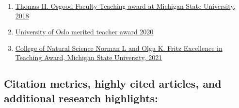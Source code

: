 \documentclass[%
oneside,                 %
final,                   %
10pt]{article}
\begin{document}
\begin{enumerate}
\item \href{{https://web.pa.msu.edu/alumni/awards/osgood_fac_awards.html}}{Thomas H. Osgood Faculty Teaching award at Michigan State University, 2018}

\item \href{{https://titan.uio.no/utdanning/2020/to-fysikere-belonnes-for%

\item \href{{https://natsci.msu.edu/faculty-staff/awards/#eta}}{College of Natural Science Norman L and Olga K. Fritz Excellence in Teaching Award, Michigan State University, 2021}
\end{enumerate}

\noindent
\subsection*{Citation metrics, highly cited articles, and additional research highlights:}
\end{document}
